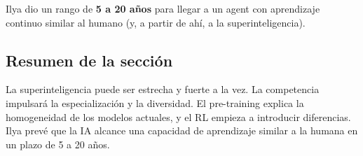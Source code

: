 Ilya dio un rango de \textbf{5 a 20 años} para llegar a un agent con aprendizaje continuo similar al humano (y, a partir de ahí, a la superinteligencia).

\subsection{Resumen de la sección}

La superinteligencia puede ser estrecha y fuerte a la vez. La competencia impulsará la especialización y la diversidad. El pre-training explica la homogeneidad de los modelos actuales, y el RL empieza a introducir diferencias. Ilya prevé que la IA alcance una capacidad de aprendizaje similar a la humana en un plazo de 5 a 20 años.

